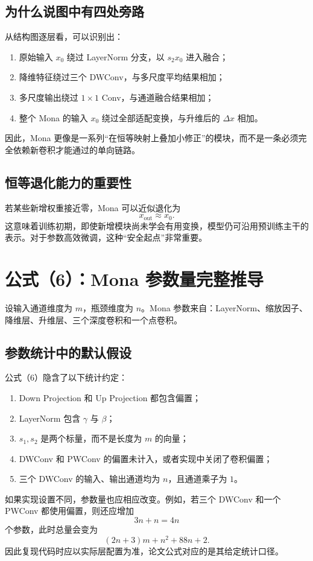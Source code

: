 \documentclass[UTF8,12pt,a4paper,fontset=none]{ctexart}
\begin{document}
\subsection{为什么说图中有四处旁路}

从结构图逐层看，可以识别出：
\begin{enumerate}
  \item 原始输入 $x_0$ 绕过 LayerNorm 分支，以 $s_2x_0$ 进入融合；
  \item 降维特征绕过三个 DWConv，与多尺度平均结果相加；
  \item 多尺度输出绕过 $1\times1$ Conv，与通道融合结果相加；
  \item 整个 Mona 的输入 $x_0$ 绕过全部适配变换，与升维后的 $\Delta x$ 相加。
\end{enumerate}

因此，Mona 更像是一系列“在恒等映射上叠加小修正”的模块，而不是一条必须完全依赖新卷积才能通过的单向链路。

\subsection{恒等退化能力的重要性}

若某些新增权重接近零，Mona 可以近似退化为
\begin{equation}
 x_{\mathrm{out}}\approx x_0.
\end{equation}
这意味着训练初期，即使新增模块尚未学会有用变换，模型仍可沿用预训练主干的表示。对于参数高效微调，这种“安全起点”非常重要。

\section{公式（6）：Mona 参数量完整推导}

设输入通道维度为 $m$，瓶颈维度为 $n$。Mona 参数来自：LayerNorm、缩放因子、降维层、升维层、三个深度卷积和一个点卷积。



\subsection{参数统计中的默认假设}

公式（6）隐含了以下统计约定：
\begin{enumerate}
  \item Down Projection 和 Up Projection 都包含偏置；
  \item LayerNorm 包含 $\gamma$ 与 $\beta$；
  \item $s_1,s_2$ 是两个标量，而不是长度为 $m$ 的向量；
  \item DWConv 和 PWConv 的偏置未计入，或者实现中关闭了卷积偏置；
  \item 三个 DWConv 的输入、输出通道均为 $n$，且通道乘子为 $1$。
\end{enumerate}
如果实现设置不同，参数量也应相应改变。例如，若三个 DWConv 和一个 PWConv 都使用偏置，则还应增加
\begin{equation}
 3n+n=4n
\end{equation}
个参数，此时总量会变为
\begin{equation}
 (2n+3)m+n^2+88n+2.
\end{equation}
因此复现代码时应以实际层配置为准，论文公式对应的是其给定统计口径。
\end{document}
